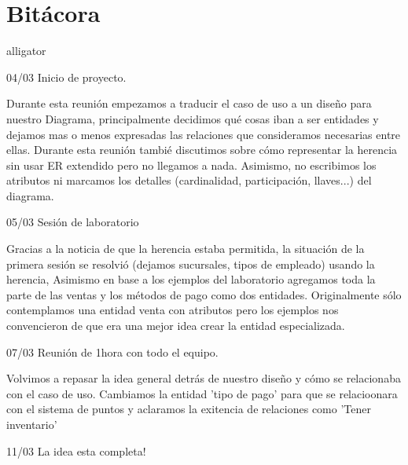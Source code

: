 \documentclass[10pt]{article}
\begin{document}
	
	
	
	\section{Bitácora}
	
	\begin{labeling}{alligator}
		\item [04/03] Inicio de proyecto.
            
            Durante esta reunión empezamos a traducir el caso de uso a un diseño para
            nuestro Diagrama, principalmente decidimos qué cosas iban a ser entidades y
            dejamos mas o menos expresadas las relaciones que consideramos necesarias
            entre ellas. Durante esta reunión tambié discutimos sobre cómo representar la
            herencia sin usar ER extendido pero no llegamos a nada. Asimismo, no escribimos
            los atributos ni marcamos los detalles (cardinalidad, participación, llaves...) del
            diagrama.
            
		\item [05/03] Sesión de laboratorio
		
            Gracias a la noticia de que la herencia estaba permitida, la situación de la primera 
            sesión se resolvió (dejamos sucursales, tipos de empleado) usando la herencia,
            Asimismo en base a los ejemplos del laboratorio agregamos toda la parte de las
            ventas y los métodos de pago como dos entidades. Originalmente sólo
            contemplamos una entidad venta con atributos pero los ejemplos nos convencieron
            de que era una mejor idea crear la entidad especializada. 
    
		\item [07/03] Reunión de 1hora con todo el equipo.
		
            Volvimos a repasar la idea general detrás de nuestro diseño y cómo se relacionaba
            con el caso de uso. Cambiamos la entidad 'tipo de pago' para que se relacioonara
            con el sistema de puntos y aclaramos la exitencia de relaciones como 'Tener
            inventario'
		\item [11/03] La idea esta completa!
	\end{labeling}
	
	
	
\end{document}

